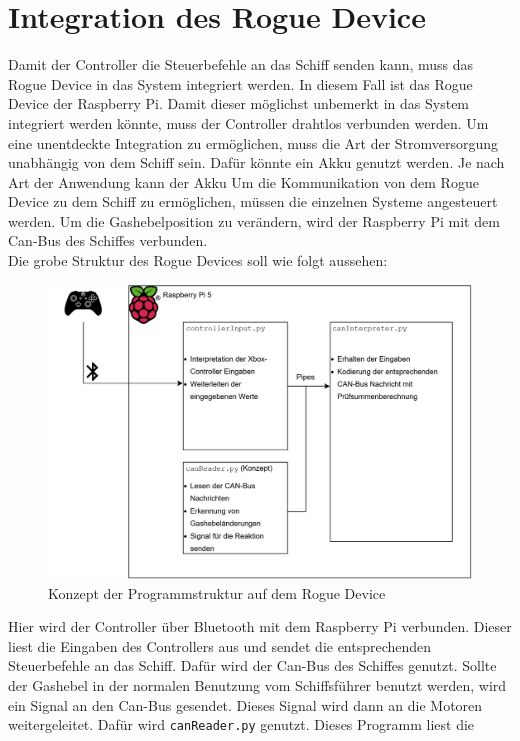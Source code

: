 \section{Integration des Rogue Device}
Damit der Controller die Steuerbefehle an das Schiff senden kann, muss das Rogue Device in das System integriert werden.
In diesem Fall ist das Rogue Device der Raspberry Pi. Damit dieser möglichst unbemerkt in das System integriert werden könnte,
muss der Controller drahtlos verbunden werden. Um eine unentdeckte Integration zu ermöglichen, muss die Art der Stromversorgung
unabhängig von dem Schiff sein. Dafür könnte ein Akku genutzt werden. Je nach Art der Anwendung kann der Akku 
Um die Kommunikation von dem Rogue Device zu dem Schiff zu ermöglichen, müssen
die einzelnen Systeme angesteuert werden. Um die Gashebelposition zu verändern, wird der Raspberry Pi mit dem Can-Bus des Schiffes
verbunden. \\
Die grobe Struktur des Rogue Devices soll wie folgt aussehen:
\begin{figure}[H]
    \centering
    \includegraphics[scale=0.4]{images/piKonzept.png}
    \caption{Konzept der Programmstruktur auf dem Rogue Device}
    \label{fig:structureRogueDevice}
\end{figure}
Hier wird der Controller über Bluetooth mit dem Raspberry Pi verbunden. Dieser liest die Eingaben des Controllers aus und
sendet die entsprechenden Steuerbefehle an das Schiff. Dafür wird der Can-Bus des Schiffes genutzt. 
Sollte der Gashebel in der normalen Benutzung vom Schiffsführer benutzt werden, wird ein Signal an den Can-Bus gesendet. 
Dieses Signal wird dann an die Motoren weitergeleitet. Dafür wird \texttt{canReader.py} genutzt. Dieses Programm liest die
